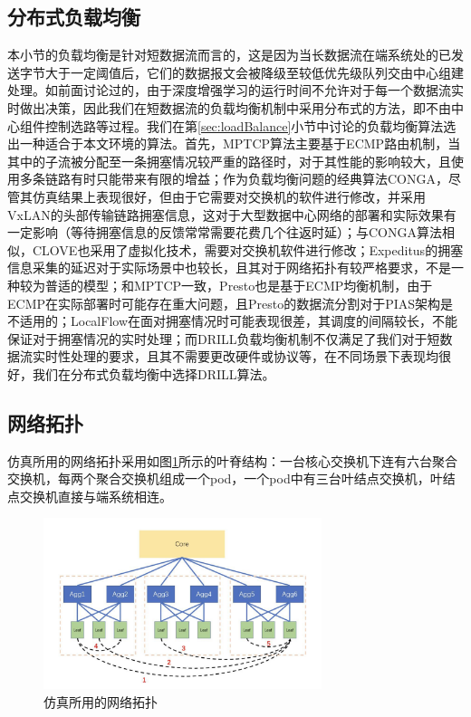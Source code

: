 \subsection{分布式负载均衡}
本小节的负载均衡是针对短数据流而言的，这是因为当长数据流在端系统处的已发送字节大于一定阈值后，它们的数据报文会被降级至较低优先级队列交由中心组建处理。如前面讨论过的，由于深度增强学习的运行时间不允许对于每一个数据流实时做出决策，因此我们在短数据流的负载均衡机制中采用分布式的方法，即不由中心组件控制选路等过程。我们在第\ref{sec:loadBalance}小节中讨论的负载均衡算法选出一种适合于本文环境的算法。首先，MPTCP算法主要基于ECMP路由机制，当其中的子流被分配至一条拥塞情况较严重的路径时，对于其性能的影响较大，且使用多条链路有时只能带来有限的增益；作为负载均衡问题的经典算法CONGA，尽管其仿真结果上表现很好，但由于它需要对交换机的软件进行修改，并采用VxLAN的头部传输链路拥塞信息，这对于大型数据中心网络的部署和实际效果有一定影响（等待拥塞信息的反馈常常需要花费几个往返时延）；与CONGA算法相似，CLOVE也采用了虚拟化技术，需要对交换机软件进行修改；Expeditus的拥塞信息采集的延迟对于实际场景中也较长，且其对于网络拓扑有较严格要求，不是一种较为普适的模型；和MPTCP一致，Presto也是基于ECMP均衡机制，由于ECMP在实际部署时可能存在重大问题，且Presto的数据流分割对于PIAS架构是不适用的；LocalFlow在面对拥塞情况时可能表现很差，其调度的间隔较长，不能保证对于拥塞情况的实时处理；而DRILL负载均衡机制不仅满足了我们对于短数据流实时性处理的要求，且其不需要更改硬件或协议等，在不同场景下表现均很好，我们在分布式负载均衡中选择DRILL算法。
\subsection{网络拓扑}
仿真所用的网络拓扑采用如图\ref{fig:netw_archi}所示的叶脊结构：一台核心交换机下连有六台聚合交换机，每两个聚合交换机组成一个pod，一个pod中有三台叶结点交换机，叶结点交换机直接与端系统相连。
\begin{figure}[ht]
\centering
\includegraphics[height=5cm]{figure/topo.jpeg}
\caption{仿真所用的网络拓扑}
\label{fig:netw_archi}
\end{figure}



